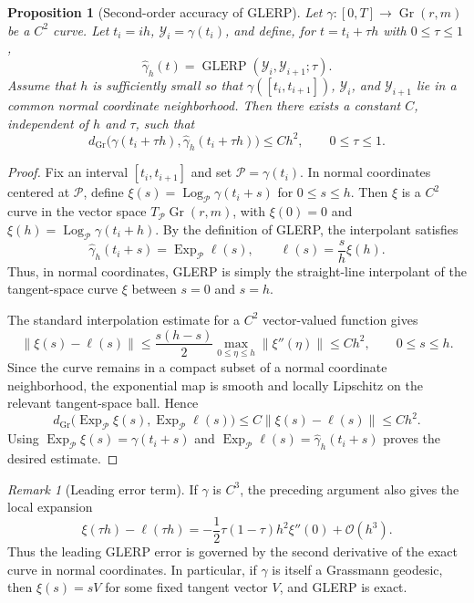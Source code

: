 \documentclass[a4paper,11pt]{article}
\newcommand{\Log}{\operatorname{Log}}
\newcommand{\Exp}{\operatorname{Exp}}
\DeclareMathOperator{\Gr}{Gr}
\newcommand{\norm}[1]{\left\lVert #1 \right\rVert}
\newcommand{\GLERP}{\operatorname{GLERP}}
\numberwithin{equation}{section}
\theoremstyle{plain}
\newtheorem{prop}[thm]{Proposition}
\theoremstyle{definition}
\theoremstyle{remark}
\newtheorem{remark}[thm]{Remark}
\begin{document}
\begin{prop}[Second-order accuracy of GLERP]\label{prop:glerp_second_order}
Let \(\gamma:[0,T]\to\Gr(r,m)\) be a \(C^2\) curve. Let \(t_i=ih\), \(\mathcal{Y}_i=\gamma(t_i)\), and define, for \(t=t_i+\tau h\) with \(0\le \tau\le 1\),
\[
    \widehat{\gamma}_h(t)
    =
    \GLERP(\mathcal{Y}_i,\mathcal{Y}_{i+1};\tau).
\]
Assume that \(h\) is sufficiently small so that \(\gamma([t_i,t_{i+1}])\), \(\mathcal{Y}_i\), and \(\mathcal{Y}_{i+1}\) lie in a common normal coordinate neighborhood. Then there exists a constant \(C\), independent of \(h\) and \(\tau\), such that
\[
    d_{\Gr}\bigl(\gamma(t_i+\tau h),
    \widehat{\gamma}_h(t_i+\tau h)\bigr)
    \le
    Ch^2,
    \qquad 0\le \tau\le 1.
\]
\end{prop}

\begin{proof}
Fix an interval \([t_i,t_{i+1}]\) and set \(\mathcal{P}=\gamma(t_i)\). In normal coordinates centered at \(\mathcal{P}\), define \(\xi(s)=\Log_{\mathcal{P}}\gamma(t_i+s)\) for \(0\le s\le h\). Then \(\xi\) is a \(C^2\) curve in the vector space \(T_{\mathcal{P}}\Gr(r,m)\), with \(\xi(0)=0\) and \(\xi(h)=\Log_{\mathcal{P}}\gamma(t_i+h)\). By the definition of GLERP, the interpolant satisfies
\[
    \widehat{\gamma}_h(t_i+s)=\Exp_{\mathcal{P}}\ell(s),
    \qquad
    \ell(s)=\frac{s}{h}\xi(h).
\]
Thus, in normal coordinates, GLERP is simply the straight-line interpolant of the tangent-space curve \(\xi\) between \(s=0\) and \(s=h\).

The standard interpolation estimate for a \(C^2\) vector-valued function gives
\[
    \norm{\xi(s)-\ell(s)}
    \le
    \frac{s(h-s)}{2}
    \max_{0\le \eta\le h}\norm{\xi''(\eta)}
    \le
    Ch^2,
    \qquad 0\le s\le h.
\]
Since the curve remains in a compact subset of a normal coordinate neighborhood, the exponential map is smooth and locally Lipschitz on the relevant tangent-space ball. Hence
\[
    d_{\Gr}\bigl(\Exp_{\mathcal{P}}\xi(s),
    \Exp_{\mathcal{P}}\ell(s)\bigr)
    \le
    C\norm{\xi(s)-\ell(s)}
    \le
    Ch^2.
\]
Using \(\Exp_{\mathcal{P}}\xi(s)=\gamma(t_i+s)\) and \(\Exp_{\mathcal{P}}\ell(s)=\widehat{\gamma}_h(t_i+s)\) proves the desired estimate.
\end{proof}

\begin{remark}[Leading error term]
If \(\gamma\) is \(C^3\), the preceding argument also gives the local expansion
\[
    \xi(\tau h)-\ell(\tau h)
    =
    -\frac{1}{2}\tau(1-\tau)h^2\xi''(0)
    +
    \mathcal{O}(h^3).
\]
Thus the leading GLERP error is governed by the second derivative of the exact curve in normal coordinates. In particular, if \(\gamma\) is itself a Grassmann geodesic, then \(\xi(s)=sV\) for some fixed tangent vector \(V\), and GLERP is exact.
\end{remark}
\end{document}
